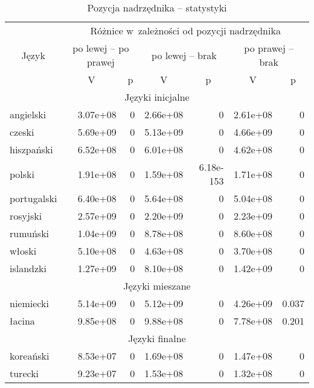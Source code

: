 \begin{table}[h!]
\centering
\begin{tabular}{lrrrrrr}
  \toprule
		& \multicolumn{6}{c}{Różnice w~zależności od pozycji nadrzędnika}	\\
\multicolumn{1}{c}{Język} & \multicolumn{2}{c}{po lewej -- po prawej} & \multicolumn{2}{c}{po lewej -- brak} & \multicolumn{2}{c}{po prawej -- brak} \\
		& \multicolumn{1}{c}{V} & \multicolumn{1}{c}{p} & \multicolumn{1}{c}{V} & \multicolumn{1}{c}{p} & \multicolumn{1}{c}{V} & \multicolumn{1}{c}{p} \\
\midrule
\multicolumn{7}{c}{Języki inicjalne} \\
\midrule
angielski	& 3.07e+08 & 0 & 2.66e+08 & 0 & 2.61e+08 & 0 \\ 
czeski		& 5.69e+09 & 0 & 5.13e+09 & 0 & 4.66e+09 & 0 \\ 
hiszpański	& 6.52e+08 & 0 & 6.01e+08 & 0 & 4.62e+08 & 0 \\  
polski		& 1.91e+08 & 0 & 1.59e+08 & 6.18e-153 & 1.71e+08 & 0 \\ 
portugalski	& 6.40e+08 & 0 & 5.64e+08 & 0 & 5.04e+08 & 0 \\ 
rosyjski		& 2.57e+09 & 0 & 2.20e+09 & 0 & 2.23e+09 & 0 \\ 
rumuński		& 1.04e+09 & 0 & 8.78e+08 & 0 & 8.60e+08 & 0 \\ 
włoski		& 5.10e+08 & 0 & 4.63e+08 & 0 & 3.70e+08 & 0 \\
\hdashline
islandzki	& 1.27e+09 & 0 & 8.10e+08 & 0 & 1.42e+09 & 0 \\ 
\midrule
\multicolumn{7}{c}{Języki mieszane} \\
\midrule
niemiecki	& 5.14e+09 & 0 & 5.12e+09 & 0 & 4.26e+09 & 0.037 \\ 
łacina		& 9.85e+08 & 0 & 9.88e+08 & 0 & 7.78e+08 & 0.201 \\ 
\midrule
\multicolumn{7}{c}{Języki finalne} \\
\midrule
koreański	& 8.53e+07 & 0 & 1.69e+08 & 0 & 1.47e+08 & 0 \\ 
turecki		& 9.23e+07 & 0 & 1.53e+08 & 0 & 1.32e+08 & 0 \\ 
   \bottomrule
\end{tabular}
\label{tab:stat}
\caption{Pozycja nadrzędnika -- statystyki}
\end{table}